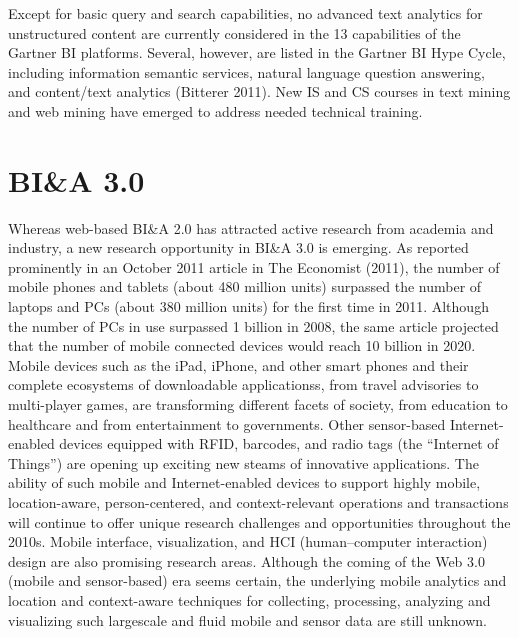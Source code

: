 Except for basic query and search capabilities, no advanced
text analytics for unstructured content are currently considered in the 13 capabilities of the Gartner BI platforms.
Several, however, are listed in the Gartner BI Hype Cycle,
including information semantic services, natural language
question answering, and content/text analytics (Bitterer 2011). 
New IS and CS courses in text mining and web mining have
emerged to address needed technical training.

\section*{BI\&A 3.0}

Whereas web-based BI\&A 2.0 has attracted active research
from academia and industry, a new research opportunity in
BI\&A 3.0 is emerging. As reported prominently in an
October 2011 article in The Economist (2011), the number of
mobile phones and tablets (about 480 million units) surpassed
the number of laptops and PCs (about 380 million units) for
the first time in 2011. Although the number of PCs in use
surpassed 1 billion in 2008, the same article projected that the
number of mobile connected devices would reach 10 billion
in 2020. Mobile devices such as the iPad, iPhone, and other
smart phones and their complete ecosystems of downloadable
applicationss, from travel advisories to multi-player games,
are transforming different facets of society, from education to
healthcare and from entertainment to governments. Other
sensor-based Internet-enabled devices equipped with RFID,
barcodes, and radio tags (the “Internet of Things”) are
opening up exciting new steams of innovative applications.
The ability of such mobile and Internet-enabled devices to
support highly mobile, location-aware, person-centered, and
context-relevant operations and transactions will continue to
offer unique research challenges and opportunities throughout
the 2010s. Mobile interface, visualization, and HCI
(human–computer interaction) design are also promising
research areas. Although the coming of the Web 3.0 (mobile
and sensor-based) era seems certain, the underlying mobile
analytics and location and context-aware techniques for
collecting, processing, analyzing and visualizing such largescale
and fluid mobile and sensor data are still unknown.

